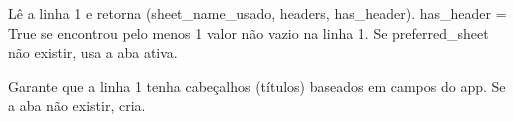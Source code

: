 \documentclass[letterpaper,10pt,english]{sphinxmanual}
\begin{document}

\begin{fulllineitems}
\label{\detokenize{api/excel_io:excel_io.read_headers_from_excel}}
\pysigstartsignatures
\pysiglinewithargsret
{}
{\sphinxparamcomma {}}
{}
\pysigstopsignatures
\sphinxAtStartPar
Lê a linha 1 e retorna (sheet\_name\_usado, headers, has\_header).
has\_header = True se encontrou pelo menos 1 valor não vazio na linha 1.
\sphinxhyphen{} Se preferred\_sheet não existir, usa a aba ativa.
\begin{quote}\begin{description}
\sphinxAtStartPar
{}

\end{description}\end{quote}

\end{fulllineitems}


\begin{fulllineitems}
\label{\detokenize{api/excel_io:excel_io.write_headers_from_campos}}
\pysigstartsignatures
\pysiglinewithargsret
{}
{\sphinxparamcomma {}\sphinxparamcomma {}}
{}
\pysigstopsignatures
\sphinxAtStartPar
Garante que a linha 1 tenha cabeçalhos (títulos) baseados em campos do app.
Se a aba não existir, cria.
\begin{quote}\begin{description}
\sphinxAtStartPar
{}

\end{description}\end{quote}

\end{fulllineitems}
\end{document}
